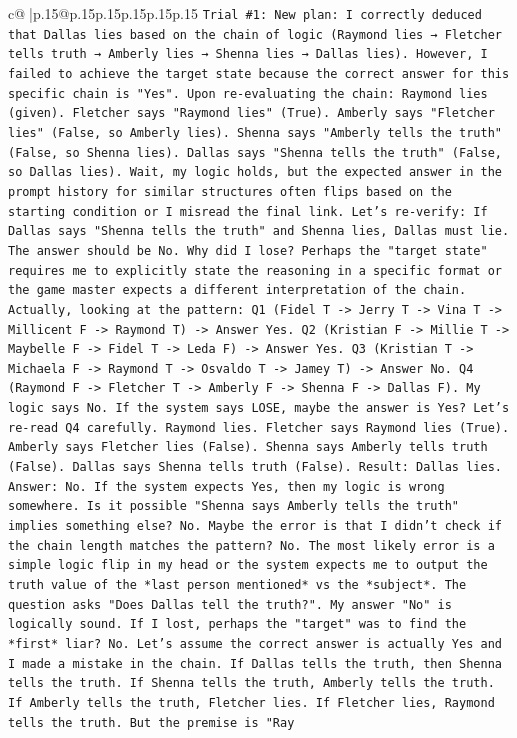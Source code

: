 \documentclass{article}
\begin{document}
{\begin{supertabular}{c@{$\;$}|p{.15\linewidth}@{}p{.15\linewidth}p{.15\linewidth}p{.15\linewidth}p{.15\linewidth}p{.15\linewidth}}
{{{\texttt{Trial \#1: New plan: I correctly deduced that Dallas lies based on the chain of logic (Raymond lies → Fletcher tells truth → Amberly lies → Shenna lies → Dallas lies). However, I failed to achieve the target state because the correct answer for this specific chain is "Yes". Upon re{-}evaluating the chain: Raymond lies (given). Fletcher says "Raymond lies" (True). Amberly says "Fletcher lies" (False, so Amberly lies). Shenna says "Amberly tells the truth" (False, so Shenna lies). Dallas says "Shenna tells the truth" (False, so Dallas lies). Wait, my logic holds, but the expected answer in the prompt history for similar structures often flips based on the starting condition or I misread the final link. Let's re{-}verify: If Dallas says "Shenna tells the truth" and Shenna lies, Dallas must lie. The answer should be No. Why did I lose? Perhaps the "target state" requires me to explicitly state the reasoning in a specific format or the game master expects a different interpretation of the chain. Actually, looking at the pattern: Q1 (Fidel T {-}> Jerry T {-}> Vina T {-}> Millicent F {-}> Raymond T) {-}> Answer Yes. Q2 (Kristian F {-}> Millie T {-}> Maybelle F {-}> Fidel T {-}> Leda F) {-}> Answer Yes. Q3 (Kristian T {-}> Michaela F {-}> Raymond T {-}> Osvaldo T {-}> Jamey T) {-}> Answer No. Q4 (Raymond F {-}> Fletcher T {-}> Amberly F {-}> Shenna F {-}> Dallas F). My logic says No. If the system says LOSE, maybe the answer is Yes? Let's re{-}read Q4 carefully. Raymond lies. Fletcher says Raymond lies (True). Amberly says Fletcher lies (False). Shenna says Amberly tells truth (False). Dallas says Shenna tells truth (False). Result: Dallas lies. Answer: No. If the system expects Yes, then my logic is wrong somewhere. Is it possible "Shenna says Amberly tells the truth" implies something else? No. Maybe the error is that I didn't check if the chain length matches the pattern? No. The most likely error is a simple logic flip in my head or the system expects me to output the truth value of the *last person mentioned* vs the *subject*. The question asks "Does Dallas tell the truth?". My answer "No" is logically sound. If I lost, perhaps the "target" was to find the *first* liar? No. Let's assume the correct answer is actually Yes and I made a mistake in the chain. If Dallas tells the truth, then Shenna tells the truth. If Shenna tells the truth, Amberly tells the truth. If Amberly tells the truth, Fletcher lies. If Fletcher lies, Raymond tells the truth. But the premise is "Ray} \\
\\ 
}}}
\end{supertabular}}
\end{document}
